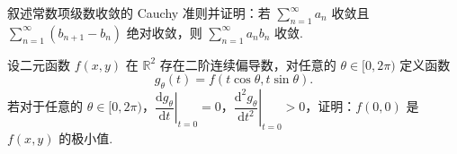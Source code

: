\documentclass[UTF8,14pt,normal]{ctexart}
\begin{document}
 叙述常数项级数收敛的 Cauchy 准则并证明：若 $\displaystyle\sum\limits_{n=1}^{\infty} a_n$ 收敛且 $\displaystyle\sum\limits_{n=1}^{\infty}(b_{n+1} - b_n)$ 绝对收敛，则 $\displaystyle\sum\limits_{n=1}^{\infty} a_nb_n$ 收敛.

 设二元函数 $f(x, y)$ 在 $\mathbb{R}^2$ 存在二阶连续偏导数，对任意的 $\theta\in [0, 2\pi)$ 定义函数 \[g_\theta(t) = f(t\cos\theta, t\sin\theta).\]
若对于任意的 $\theta\in [0, 2\pi)$，$\left.\dfrac{\mathrm{d}g_\theta}{\mathrm{d}t}\right\vert_{t=0} = 0$，$\left.\dfrac{\mathrm{d}^2g_\theta}{\mathrm{d}t^2}\right\vert_{t=0} > 0$，证明：$f(0, 0)$ 是 $f(x, y)$ 的极小值.
\end{document}
